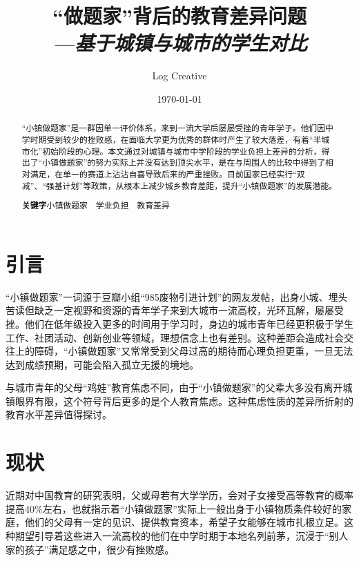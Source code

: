 \documentclass[10pt,a4paper,heading=false]{ctexart}
\begin{document}
    \title{\vspace{-3cm}“做题家”背后的教育差异问题
    \\\hspace*{15ex}\emph{\Large---基于城镇与城市的学生对比}
    }
    \author{Log Creative}
    \date{\today}
    \maketitle
    \begin{abstract}
        “小镇做题家”是一群因单一评价体系，来到一流大学后屡屡受挫的青年学子。他们因中学时期受到较少的挫败感，在面临大学更为优秀的群体时产生了较大落差，有着“半城市化”初始阶段的心理。本文通过对城镇与城市中学阶段的学业负担上差异的分析，得出了“小镇做题家”的努力实际上并没有达到顶尖水平，是在与周围人的比较中得到了相对满足，在单一的赛道上沾沾自喜导致后来的严重挫败。目前国家已经实行“双减”、“强基计划”等政策，从根本上减少城乡教育差距，提升“小镇做题家”的发展潜能。

        \textbf{关键字}\quad 小镇做题家~~学业负担~~教育差异
    \end{abstract}
    \section{引言}
    “小镇做题家”一词源于豆瓣小组“985废物引进计划”的网友发帖，出身小城、埋头苦读但缺乏一定视野和资源的青年学子来到大城市一流高校，光环瓦解，屡屡受挫。\cite{solver}他们在低年级投入更多的时间用于学习时，身边的城市青年已经更积极于学生工作、社团活动、创新创业等领域，理想信念上也有差别。这种差距会造成社会交往上的障碍，“小镇做题家”又常常受到父母过高的期待而心理负担更重，一旦无法达到成绩预期，可能会陷入孤立无援的境地。\cite{solveranalysis}

    与城市青年的父母“鸡娃”教育焦虑不同，由于“小镇做题家”的父辈大多没有离开城镇眼界有限，这个符号背后更多的是个人教育焦虑。这种焦虑性质的差异所折射的教育水平差异值得探讨。
    \section{现状}
    近期对中国教育的研究表明，父或母若有大学学历，会对子女接受高等教育的概率提高40\%左右\cite{familyedu}，也就指示着“小镇做题家”实际上一般出身于小镇物质条件较好的家庭，他们的父母有一定的见识、提供教育资本，希望子女能够在城市扎根立足。这种期望引导着这些进入一流高校的他们在中学时期于本地名列前茅，沉浸于“别人家的孩子”满足感之中，很少有挫败感。
\end{document}
